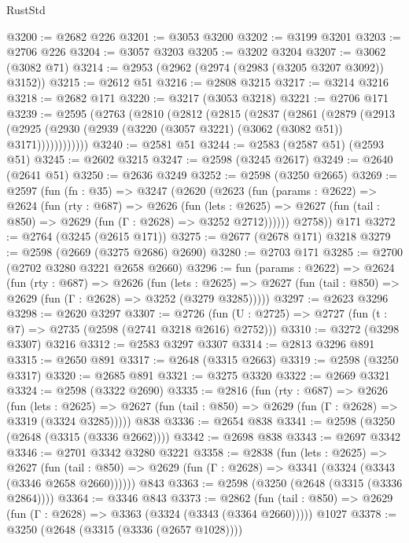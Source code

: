 \begin{lexlean}{RustStd}
\begin{coremodule}
@3200 := @2682 @226
@3201 := @3053 @3200
@3202 := @3199 @3201
@3203 := @2706 @226
@3204 := @3057 @3203
@3205 := @3202 @3204
@3207 := @3062 (@3082 @71)
@3214 := @2953 (@2962 (@2974 (@2983 (@3205 @3207 @3092)) @3152))
@3215 := @2612 @51
@3216 := @2808 @3215
@3217 := @3214 @3216
@3218 := @2682 @171
@3220 := @3217 (@3053 @3218)
@3221 := @2706 @171
@3239 := @2595
    (@2763
      (@2810
        (@2812
          (@2815
            (@2837
              (@2861
                (@2879
                  (@2913
                    (@2925 (@2930 (@2939 (@3220 (@3057 @3221) (@3062 (@3082 @51)) @3171))))))))))))
@3240 := @2581 @51
@3244 := @2583 (@2587 @51) (@2593 @51)
@3245 := @2602 @3215
@3247 := @2598 (@3245 @2617)
@3249 := @2640 (@2641 @51)
@3250 := @2636 @3249
@3252 := @2598 (@3250 @2665)
@3269 := @2597
    (fun (fn : @35) =>
    @3247
      (@2620
        (@2623
          (fun (params : @2622) =>
          @2624
            (fun (rty : @687) =>
            @2626
              (fun (lets : @2625) =>
              @2627 (fun (tail : @850) => @2629 (fun (Γ : @2628) => @3252 @2712))))))
        @2758))
    @171
@3272 := @2764 (@3245 (@2615 @171))
@3275 := @2677 (@2678 @171) @3218
@3279 := @2598 (@2669 (@3275 @2686) @2690)
@3280 := @2703 @171
@3285 := @2700 (@2702 @3280 @3221 @2658 @2660)
@3296 := fun (params : @2622) =>
  @2624
    (fun (rty : @687) =>
    @2626
      (fun (lets : @2625) =>
      @2627 (fun (tail : @850) => @2629 (fun (Γ : @2628) => @3252 (@3279 @3285)))))
@3297 := @2623 @3296
@3298 := @2620 @3297
@3307 := @2726 (fun (U : @2725) => @2727 (fun (t : @7) => @2735 (@2598 (@2741 @3218 @2616) @2752)))
@3310 := @3272 (@3298 @3307) @3216
@3312 := @2583 @3297 @3307
@3314 := @2813 @3296 @891
@3315 := @2650 @891
@3317 := @2648 (@3315 @2663)
@3319 := @2598 (@3250 @3317)
@3320 := @2685 @891
@3321 := @3275 @3320
@3322 := @2669 @3321
@3324 := @2598 (@3322 @2690)
@3335 := @2816
    (fun (rty : @687) =>
    @2626
      (fun (lets : @2625) =>
      @2627 (fun (tail : @850) => @2629 (fun (Γ : @2628) => @3319 (@3324 @3285)))))
    @838
@3336 := @2654 @838
@3341 := @2598 (@3250 (@2648 (@3315 (@3336 @2662))))
@3342 := @2698 @838
@3343 := @2697 @3342
@3346 := @2701 @3342 @3280 @3221
@3358 := @2838
    (fun (lets : @2625) =>
    @2627
      (fun (tail : @850) => @2629 (fun (Γ : @2628) => @3341 (@3324 (@3343 (@3346 @2658 @2660))))))
    @843
@3363 := @2598 (@3250 (@2648 (@3315 (@3336 @2864))))
@3364 := @3346 @843
@3373 := @2862
    (fun (tail : @850) => @2629 (fun (Γ : @2628) => @3363 (@3324 (@3343 (@3364 @2660)))))
    @1027
@3378 := @3250 (@2648 (@3315 (@3336 (@2657 @1028))))

\end{coremodule}
\end{lexlean}
